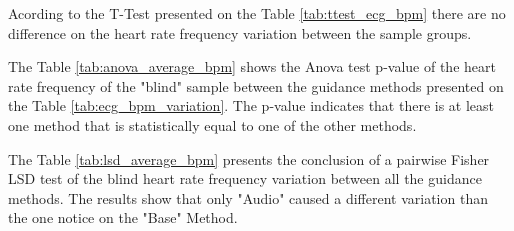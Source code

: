 

Acording to the T-Test presented on the Table \ref{tab:ttest_ecg_bpm} there are no difference on the heart rate frequency variation between the sample groups.



The Table \ref{tab:anova_average_bpm} shows the Anova test p-value of the heart rate frequency of the "blind" sample between the guidance methods presented on the Table \ref{tab:ecg_bpm_variation}. The p-value indicates that there is at least one method that is statistically equal to one of the other methods.



The Table \ref{tab:lsd_average_bpm} presents the conclusion of a pairwise Fisher LSD test of the blind heart rate frequency variation between all the guidance methods. The results show that only "Audio" caused a different variation than the one notice on the "Base" Method.



